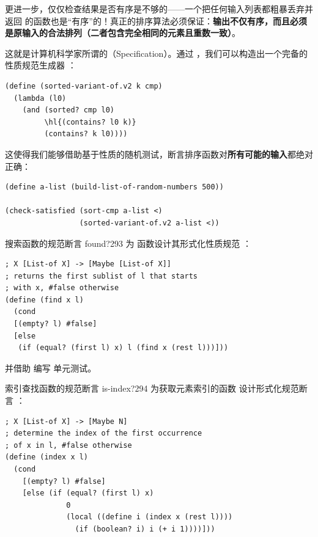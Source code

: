 更进一步，仅仅检查结果是否有序是不够的——一个把任何输入列表都粗暴丢弃并返回  的函数也是“有序”的！真正的排序算法必须保证：\textbf{输出不仅有序，而且必须是原输入的合法排列（二者包含完全相同的元素且重数一致）}。

这就是计算机科学家所谓的（Specification）。通过 ，我们可以构造出一个完备的性质规范生成器 ：

\begin{stepperbox}
\begin{Verbatim}[commandchars=\\\{\}, fontsize=\footnotesize]
(define (sorted-variant-of.v2 k cmp)
  (lambda (l0)
    (and (sorted? cmp l0)
         \hl{(contains? l0 k)}
         (contains? k l0))))
\end{Verbatim}
\end{stepperbox}

这使得我们能够借助基于性质的随机测试，断言排序函数对\textbf{所有可能的输入}都绝对正确：

\begin{lstlisting}[language=BSL]
(define a-list (build-list-of-random-numbers 500))

(check-satisfied (sort-cmp a-list <)
                 (sorted-variant-of.v2 a-list <))
\end{lstlisting}

\begin{exercise}{搜索函数的规范断言 found?}{293}
为  函数设计其形式化性质规范 ：

\begin{lstlisting}[language=BSL]
; X [List-of X] -> [Maybe [List-of X]]
; returns the first sublist of l that starts
; with x, #false otherwise
(define (find x l)
  (cond
  [(empty? l) #false]
  [else
   (if (equal? (first l) x) l (find x (rest l)))]))
\end{lstlisting}

并借助  编写  单元测试。
\end{exercise}

\begin{exercise}{索引查找函数的规范断言 is-index?}{294}
为获取元素索引的函数  设计形式化规范断言 ：

\begin{lstlisting}[language=BSL]
; X [List-of X] -> [Maybe N]
; determine the index of the first occurrence
; of x in l, #false otherwise
(define (index x l)
  (cond
    [(empty? l) #false]
    [else (if (equal? (first l) x)
              0
              (local ((define i (index x (rest l))))
                (if (boolean? i) i (+ i 1))))]))
\end{lstlisting}
\end{exercise}

